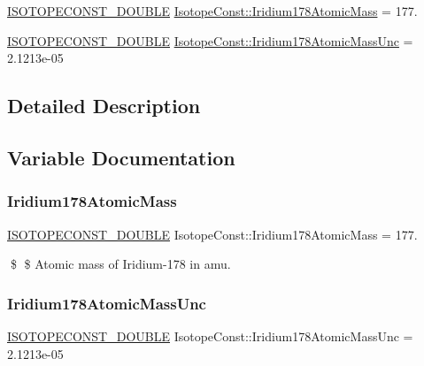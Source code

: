 \begin{DoxyCompactItemize}
\item 
\mbox{\hyperlink{group___isotope_const-_macros_ga8f45a7272ce02c0b4c65c44636ed719a}{I\+S\+O\+T\+O\+P\+E\+C\+O\+N\+S\+T\+\_\+\+D\+O\+U\+B\+LE}} \mbox{\hyperlink{group___isotope_const-_iridium-_ir178_ga90055b046f95a1d0c512a2e62697eb07}{Isotope\+Const\+::\+Iridium178\+Atomic\+Mass}} = 177.
\item 
\mbox{\hyperlink{group___isotope_const-_macros_ga8f45a7272ce02c0b4c65c44636ed719a}{I\+S\+O\+T\+O\+P\+E\+C\+O\+N\+S\+T\+\_\+\+D\+O\+U\+B\+LE}} \mbox{\hyperlink{group___isotope_const-_iridium-_ir178_ga3f9ca77d98ee516dbad9635670f41c4d}{Isotope\+Const\+::\+Iridium178\+Atomic\+Mass\+Unc}} = 2.\+1213e-\/05
\end{DoxyCompactItemize}


\subsection{Detailed Description}


\subsection{Variable Documentation}
\mbox{\label{group___isotope_const-_iridium-_ir178_ga90055b046f95a1d0c512a2e62697eb07}} 
\subsubsection{\texorpdfstring{Iridium178\+Atomic\+Mass}{Iridium178AtomicMass}}
{\footnotesize\ttfamily \mbox{\hyperlink{group___isotope_const-_macros_ga8f45a7272ce02c0b4c65c44636ed719a}{I\+S\+O\+T\+O\+P\+E\+C\+O\+N\+S\+T\+\_\+\+D\+O\+U\+B\+LE}} Isotope\+Const\+::\+Iridium178\+Atomic\+Mass = 177.}

\$ \$ Atomic mass of Iridium-\/178 in amu. \mbox{\label{group___isotope_const-_iridium-_ir178_ga3f9ca77d98ee516dbad9635670f41c4d}} 
\subsubsection{\texorpdfstring{Iridium178\+Atomic\+Mass\+Unc}{Iridium178AtomicMassUnc}}
{\footnotesize\ttfamily \mbox{\hyperlink{group___isotope_const-_macros_ga8f45a7272ce02c0b4c65c44636ed719a}{I\+S\+O\+T\+O\+P\+E\+C\+O\+N\+S\+T\+\_\+\+D\+O\+U\+B\+LE}} Isotope\+Const\+::\+Iridium178\+Atomic\+Mass\+Unc = 2.\+1213e-\/05}

